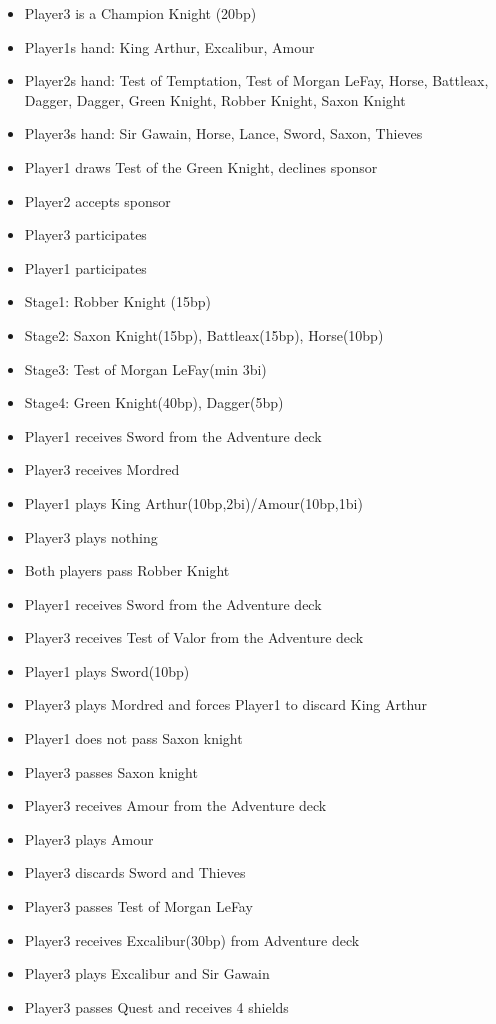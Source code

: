 \documentclass[11pt]{article}
\begin{document}
\begin{enumerate}
\begin{itemize}
	\item Player3 is a Champion Knight (20bp)
	\item Player1s hand: King Arthur, Excalibur, Amour
	\item Player2s hand: Test of Temptation, Test of Morgan LeFay, Horse, Battleax, Dagger, Dagger, Green Knight, Robber Knight, Saxon Knight
	\item Player3s hand: Sir Gawain, Horse, Lance, Sword, Saxon, Thieves
	\item Player1 draws Test of the Green Knight, declines sponsor
	\item Player2 accepts sponsor
	\item Player3 participates
	\item Player1 participates
	\item Stage1: Robber Knight (15bp)
	\item Stage2: Saxon Knight(15bp), Battleax(15bp), Horse(10bp)
	\item Stage3: Test of Morgan LeFay(min 3bi)
	\item Stage4: Green Knight(40bp), Dagger(5bp)
	\item Player1 receives Sword from the Adventure deck
	\item Player3 receives Mordred
	\item Player1 plays King Arthur(10bp,2bi)/Amour(10bp,1bi)
	\item Player3 plays nothing
	\item Both players pass Robber Knight
	\item Player1 receives Sword from the Adventure deck
	\item Player3 receives Test of Valor from the Adventure deck
	\item Player1 plays Sword(10bp)
	\item Player3 plays Mordred and forces Player1 to discard King Arthur
	\item Player1 does not pass Saxon knight
	\item Player3 passes Saxon knight
	\item Player3 receives Amour from the Adventure deck
	\item Player3 plays Amour
	\item Player3 discards Sword and Thieves
	\item Player3 passes Test of Morgan LeFay
	\item Player3 receives Excalibur(30bp) from Adventure deck
	\item Player3 plays Excalibur and Sir Gawain
	\item Player3 passes Quest and receives 4 shields

\end{itemize}
\end{enumerate}
\end{document}
